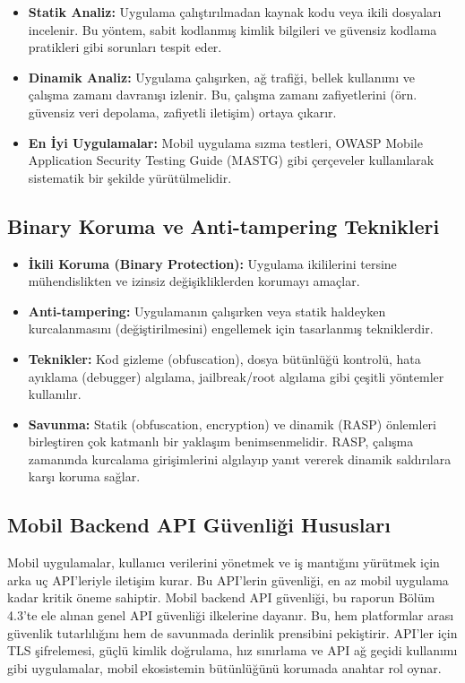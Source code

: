 \begin{itemize}
\item \textbf{Statik Analiz:} Uygulama çalıştırılmadan kaynak kodu veya ikili dosyaları incelenir. Bu yöntem, sabit kodlanmış kimlik bilgileri ve güvensiz kodlama pratikleri gibi sorunları tespit eder.
\item \textbf{Dinamik Analiz:} Uygulama çalışırken, ağ trafiği, bellek kullanımı ve çalışma zamanı davranışı izlenir. Bu, çalışma zamanı zafiyetlerini (örn. güvensiz veri depolama, zafiyetli iletişim) ortaya çıkarır.
\item \textbf{En İyi Uygulamalar:} Mobil uygulama sızma testleri, OWASP Mobile Application Security Testing Guide (MASTG) gibi çerçeveler kullanılarak sistematik bir şekilde yürütülmelidir.
\end{itemize}
\subsection{Binary Koruma ve Anti-tampering Teknikleri}
\begin{itemize}
\item \textbf{İkili Koruma (Binary Protection):} Uygulama ikililerini tersine mühendislikten ve izinsiz değişikliklerden korumayı amaçlar.
\item \textbf{Anti-tampering:} Uygulamanın çalışırken veya statik haldeyken kurcalanmasını (değiştirilmesini) engellemek için tasarlanmış tekniklerdir.
\item \textbf{Teknikler:} Kod gizleme (obfuscation), dosya bütünlüğü kontrolü, hata ayıklama (debugger) algılama, jailbreak/root algılama gibi çeşitli yöntemler kullanılır.
\item \textbf{Savunma:} Statik (obfuscation, encryption) ve dinamik (RASP) önlemleri birleştiren çok katmanlı bir yaklaşım benimsenmelidir. RASP, çalışma zamanında kurcalama girişimlerini algılayıp yanıt vererek dinamik saldırılara karşı koruma sağlar.
\end{itemize}

\subsection{Mobil Backend API Güvenliği Hususları}

Mobil uygulamalar, kullanıcı verilerini yönetmek ve iş mantığını yürütmek için arka uç API'leriyle iletişim kurar. Bu API'lerin güvenliği, en az mobil uygulama kadar kritik öneme sahiptir. Mobil backend API güvenliği, bu raporun Bölüm 4.3'te ele alınan genel API güvenliği ilkelerine dayanır. Bu, hem platformlar arası güvenlik tutarlılığını hem de savunmada derinlik prensibini pekiştirir. API'ler için TLS şifrelemesi, güçlü kimlik doğrulama, hız sınırlama ve API ağ geçidi kullanımı gibi uygulamalar, mobil ekosistemin bütünlüğünü korumada anahtar rol oynar.
